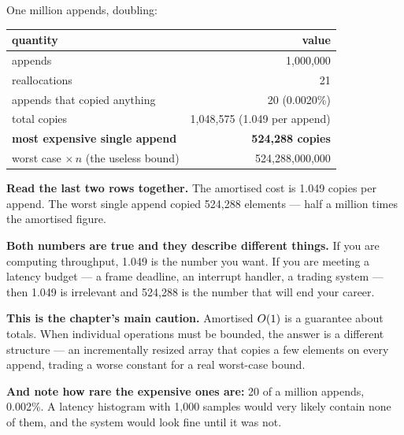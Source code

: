 \begin{worked}
One million appends, doubling:

\begin{center}
\begin{tabular}{@{}lr@{}}
\toprule
\rowcolor{primary!15}
quantity & value \\
\midrule
appends & 1{,}000{,}000 \\
reallocations & 21 \\
appends that copied anything & 20 \quad(0.0020\%) \\
total copies & 1{,}048{,}575 \quad(1.049 per append) \\
\textbf{most expensive single append} & \textbf{524{,}288 copies} \\
worst case $\times\, n$ (the useless bound) & 524{,}288{,}000{,}000 \\
\bottomrule
\end{tabular}
\end{center}

\smallskip
\textbf{Read the last two rows together.} The amortised cost is 1.049 copies
per append. The worst single append copied 524{,}288 elements --- half a
million times the amortised figure.

\smallskip
\textbf{Both numbers are true and they describe different things.} If you are
computing throughput, 1.049 is the number you want. If you are meeting a
latency budget --- a frame deadline, an interrupt handler, a trading system ---
then 1.049 is irrelevant and 524{,}288 is the number that will end your
career.

\smallskip
\textbf{This is the chapter's main caution.} Amortised $O(1)$ is a
guarantee about totals. When individual operations must be bounded, the answer
is a different structure --- an incrementally resized array that copies a few
elements on every append, trading a worse constant for a real worst-case
bound.

\smallskip
\textbf{And note how rare the expensive ones are:} 20 of a million appends,
0.002\%. A latency histogram with 1{,}000 samples would very likely contain
none of them, and the system would look fine until it was not.
\end{worked}

